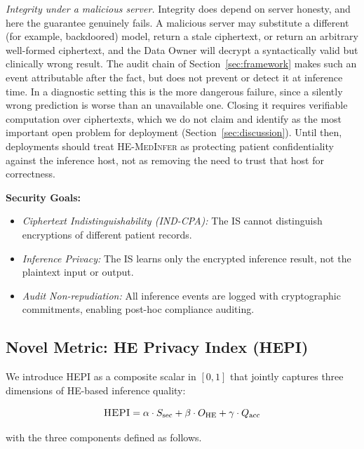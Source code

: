 \documentclass[journal,compsoc]{IEEEtran}
\newcommand{\HEPI}{\textsc{HEPI}}          %
\newcommand{\framework}{\textsc{HE-MedInfer}}
\begin{document}
\emph{Integrity under a malicious server.} Integrity does depend on server
honesty, and here the guarantee genuinely fails. A malicious server may
substitute a different (for example, backdoored) model, return a stale
ciphertext, or return an arbitrary well-formed ciphertext, and the Data Owner
will decrypt a syntactically valid but clinically wrong result. The audit chain
of Section~\ref{sec:framework} makes such an event attributable after the fact,
but does not prevent or detect it at inference time. In a diagnostic setting
this is the more dangerous failure, since a silently wrong prediction is worse
than an unavailable one. Closing it requires verifiable computation over
ciphertexts, which we do not claim and identify as the most important open
problem for deployment (Section~\ref{sec:discussion}). Until then, deployments
should treat \framework{} as protecting patient confidentiality against the
inference host, not as removing the need to trust that host for correctness.

\textbf{Security Goals:}
\begin{itemize}
  \item \emph{Ciphertext Indistinguishability (IND-CPA):} The IS cannot
    distinguish encryptions of different patient records.
  \item \emph{Inference Privacy:} The IS learns only the encrypted inference
    result, not the plaintext input or output.
  \item \emph{Audit Non-repudiation:} All inference events are logged with
    cryptographic commitments, enabling post-hoc compliance auditing.
\end{itemize}

\subsection{Novel Metric: HE Privacy Index (\HEPI{})}

We introduce \HEPI{} as a composite scalar in $[0, 1]$ that jointly captures
three dimensions of HE-based inference quality:

\begin{equation}
  \HEPI = \alpha \cdot S_{\mathrm{sec}}
        + \beta \cdot O_{\mathrm{HE}}
        + \gamma \cdot Q_{\mathrm{acc}}
  \label{eq:hepi}
\end{equation}

\noindent with the three components defined as follows.
\end{document}
